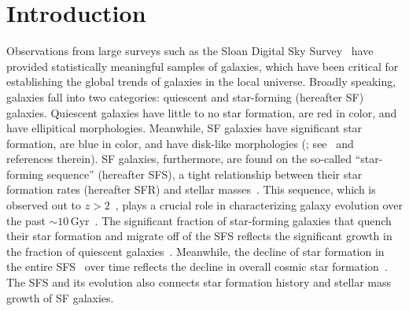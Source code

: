 \documentclass[12pt, letterpaper, preprint, tighten]{aastex62}
\begin{document}

\section{Introduction}
Observations from large surveys such as the Sloan Digital Sky 
Survey~\citep[SDSS;][]{york2000} have provided statistically 
meaningful samples of galaxies, which have been critical for 
establishing the global trends of galaxies in the local universe. 
Broadly speaking, galaxies fall into two categories: quiescent 
and star-forming (hereafter SF) galaxies. Quiescent galaxies have little to no 
star formation, are red in color, and have ellipitical morphologies. 
Meanwhile, SF galaxies have significant star formation, are blue 
in color, and have disk-like morphologies (\citealt{kauffmann2003, blanton2003, baldry2006, taylor2009, moustakas2013}; 
see~\citealt{blanton2009} and references therein). 
SF galaxies, furthermore, are found on the so-called ``star-forming sequence'' 
(hereafter SFS), a tight relationship between their star formation rates 
(hereafter SFR) and stellar masses~\citep[][see also Figure~\ref{fig:groupcat}]{noeske2007, daddi2007, salim2007, speagle2014, lee2015}.
This sequence, which is observed out to $z > 2$~\citep{wang2013, 
leja2015}, plays a crucial role in characterizing 
galaxy evolution over the past ${\sim}10\,\mathrm{Gyr}$~\citep[see][for an alternative point of view]{kelson2014,abramson2016}. 
The significant fraction of star-forming galaxies that quench their 
star formation and migrate off of the SFS reflects the significant 
growth in the fraction of quiescent galaxies~\citep{blanton2006, borch2006, bundy2006, moustakas2013}. 
Meanwhile, the decline of star formation in the entire SFS~\citep{lee2015, schreiber2015} 
over time reflects the decline in overall cosmic star formation~\citep{hopkins2006, behroozi2013, madau2014}.
The SFS and its evolution also connects star formation history
and stellar mass growth of SF galaxies. 
\end{document}
